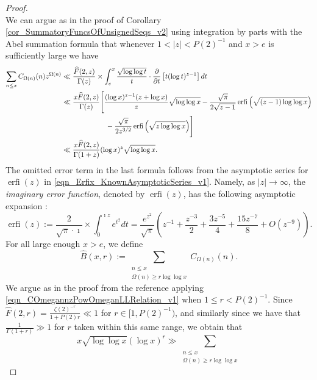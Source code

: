 \documentclass[11pt,reqno,a4letter]{article}
\numberwithin{figure}{section}
\numberwithin{table}{section}
\newcommand{\cf}{\textit{cf.\ }}
\theoremstyle{plain}
\numberwithin{theorem}{section}
\theoremstyle{definition}
\begin{document}
\begin{proof}
\[\]
We can argue as in the proof of Corollary \ref{cor_SummatoryFuncsOfUnsignedSeqs_v2} 
using integration by parts with the Abel summation formula that whenever $1 < |z| < P(2)^{-1}$ 
and $x > e$ is sufficiently large we have 
\begin{align}
\notag
\sum_{n \leq x} C_{\Omega(n)}(n) z^{\Omega(n)} & \ll \frac{\widehat{F}(2, z)}{\Gamma(z)} \times 
     \int_e^{x} \frac{\sqrt{\log\log t}}{t} \cdot 
     \frac{\partial}{\partial t}\left[ t (\log t)^{z-1}\right] dt \\ 
\notag 
     & \ll 
     \frac{x \widehat{F}(2, z)}{\Gamma(z)} \Biggl[
     \frac{(\log x)^{z-1}(z+\log x)}{z} \sqrt{\log\log x} - 
     \frac{\sqrt{\pi}}{2\sqrt{z-1}} \operatorname{erfi}\left(\sqrt{(z-1)\log\log x}\right) \\ 
\notag
     & \phantom{\ll\Biggl[\qquad\qquad\ } - 
     \frac{\sqrt{\pi}}{2 z^{3/2}} \operatorname{erfi}\left(\sqrt{z \log\log x}\right) 
     \Biggr] \\ 
\label{eqn_COmegannzPowOmeganLLRelation_v1} 
     & \ll \frac{x \widehat{F}(2, z)}{\Gamma(1+z)} (\log x)^{z} \sqrt{\log\log x}. 
\end{align}
The omitted error term in the last formula follows from the asymptotic series for 
$\operatorname{erfi}(z)$ in \eqref{eqn_Erfix_KnownAsymptoticSeries_v1}. 
Namely, as $|z| \rightarrow \infty$, the \emph{imaginary error function}, denoted by 
$\operatorname{erfi}(z)$, has the following asymptotic expansion 
\cite[\S 7.12]{NISTHB}: 
\begin{equation}
\label{eqn_Erfix_KnownAsymptoticSeries_v1}
\operatorname{erfi}(z) := \frac{2}{\sqrt{\pi} \cdot \imath} \times \int_0^{\imath z} e^{t^2} dt = 
     \frac{e^{z^2}}{\sqrt{\pi}} \left(z^{-1} + \frac{z^{-3}}{2} + 
     \frac{3z^{-5}}{4} + \frac{15 z^{-7}}{8} + O\left(z^{-9}\right)\right). 
\end{equation}
For all large enough $x > e$, we define 
\[
\widehat{B}(x, r) := \sum_{\substack{n \leq x \\ \Omega(n) \geq r\log\log x}} 
     C_{\Omega(n)}(n). 
\]
We argue as in the proof from the reference \cite[\cf Thm.\ 7.20; \S 7.4]{MV} 
applying \eqref{eqn_COmegannzPowOmeganLLRelation_v1} when $1 \leq r < P(2)^{-1}$. 
Since $\widehat{F}(2, r) = \frac{\zeta(2)^{-r}}{1+P(2)r} \ll 1$ for $r \in [1, P(2)^{-1})$, and 
similarly since we have that $\frac{1}{\Gamma(1+r)} \gg 1$ for $r$ taken within this same range, 
we obtain that 
\[
x \sqrt{\log\log x} (\log x)^{r} \gg \sum_{\substack{n \leq x \\ \Omega(n) \geq r\log\log x}} 
\]
\end{proof}
\end{document}
